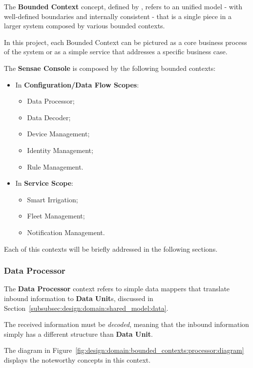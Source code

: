 The \textbf{Bounded Context} concept, defined by \cite{evans2014domain}, refers to an unified model - with well-defined boundaries and internally consistent - that is a single piece in a  larger system composed by various bounded contexts.

In this project, each Bounded Context can be pictured as a core business process of the system or as a simple service that addresses a specific business case.

The \textbf{Sensae Console} is composed by the following bounded contexts:

\begin{itemize}
   \item In \textbf{Configuration/Data Flow Scopes}:
   \begin{itemize}
      \item Data Processor;
      \item Data Decoder;
      \item Device Management;
      \item Identity Management;
      \item Rule Management.
   \end{itemize}
   \item In \textbf{Service Scope}:
   \begin{itemize}
      \item Smart Irrigation;
      \item Fleet Management;
      \item Notification Management.
   \end{itemize}
\end{itemize}

Each of this contexts will be briefly addressed in the following sections.

\subsubsection{Data Processor}
\label{subsubsec:design:domain:bounded_contexts:processor}

The \textbf{Data Processor} context refers to simple data mappers that translate inbound information to \textbf{Data Unit}s, discussed in Section~\ref{subsubsec:design:domain:shared_model:data}.

The received information must be \textit{decoded}, meaning that the inbound information simply has a different structure than \textbf{Data Unit}.

The diagram in Figure~\ref{fig:design:domain:bounded_contexts:processor:diagram} displays the noteworthy concepts in this context.

